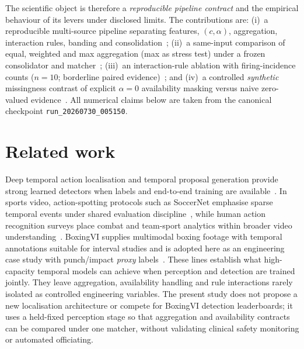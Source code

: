 \documentclass[preprint,12pt,numbers,sort&compress]{elsarticle}
\begin{document}
The scientific object is therefore a \emph{reproducible pipeline contract} and the empirical behaviour of its levers under disclosed limits.
The contributions are: (i)~a reproducible multi-source pipeline separating features, $(c,\alpha)$, aggregation, interaction rules, banding and consolidation~\cite{duan2019ai,pineau2021reproducibility}; (ii)~a same-input comparison of equal, weighted and max aggregation (max as stress test) under a frozen consolidator and matcher~\cite{wang2023tal}; (iii)~an interaction-rule ablation with firing-incidence counts ($n{=}10$; borderline paired evidence)~\cite{rudin2019interpretable,guidotti2018survey}; and (iv)~a controlled \emph{synthetic} missingness contrast of explicit $\alpha{=}0$ availability masking versus naive zero-valued evidence~\cite{emmanuel2021missing,ma2021smil,dzaferagic2021missing}.
All numerical claims below are taken from the canonical checkpoint \texttt{run\_20260730\_005150}.

\section{Related work}
\label{sec:related-work}

Deep temporal action localisation and temporal proposal generation provide strong learned detectors when labels and end-to-end training are available~\cite{lin2019bmn,lin2020dbg,xia2020tal,wang2023tal}.
In sports video, action-spotting protocols such as SoccerNet emphasise sparse temporal events under shared evaluation discipline~\cite{giancola2018soccernet}, while human action recognition surveys place combat and team-sport analytics within broader video understanding~\cite{morshed2023har,yin2024teamsports}.
BoxingVI supplies multimodal boxing footage with temporal annotations suitable for interval studies and is adopted here as an engineering case study with punch/impact \emph{proxy} labels~\cite{kumar2025boxingvi}.
These lines establish what high-capacity temporal models can achieve when perception and detection are trained jointly.
They leave aggregation, availability handling and rule interactions rarely isolated as controlled engineering variables.
The present study does not propose a new localisation architecture or compete for BoxingVI detection leaderboards; it uses a held-fixed perception stage so that aggregation and availability contracts can be compared under one matcher, without validating clinical safety monitoring or automated officiating.
\end{document}
